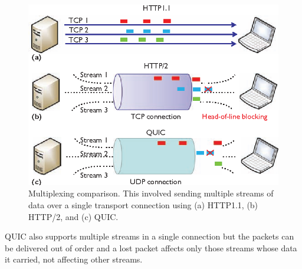 \begin{frame}
    \begin{figure}[!ht]
        
        \includegraphics[width=1\textwidth]
        {figures/hol.png}
        \endminipage\hfill
        \caption{\label{fig:hol}Multiplexing comparison. This involved sending multiple streams of data over a single transport connection using (a) HTTP1.1, (b) HTTP/2, and (c) QUIC.\cite{Cui2017}}
    \end{figure}

QUIC also supports multiple streams in a single connection but the packets can be delivered out of order and a lost packet affects only those streams whose data it carried, not affecting other streams.


\end{frame}
\clearpage

